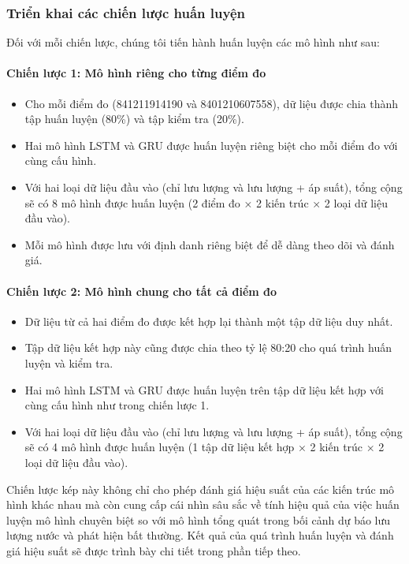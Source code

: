 \subsubsection{Triển khai các chiến lược huấn luyện}

Đối với mỗi chiến lược, chúng tôi tiến hành huấn luyện các mô hình như sau:

\paragraph{Chiến lược 1: Mô hình riêng cho từng điểm đo}
\begin{itemize}
    \item Cho mỗi điểm đo (841211914190 và 8401210607558), dữ liệu được chia thành tập huấn luyện (80\%) và tập kiểm tra (20\%).
    \item Hai mô hình LSTM và GRU được huấn luyện riêng biệt cho mỗi điểm đo với cùng cấu hình.
    \item Với hai loại dữ liệu đầu vào (chỉ lưu lượng và lưu lượng + áp suất), tổng cộng sẽ có 8 mô hình được huấn luyện (2 điểm đo × 2 kiến trúc × 2 loại dữ liệu đầu vào).
    \item Mỗi mô hình được lưu với định danh riêng biệt để dễ dàng theo dõi và đánh giá.
\end{itemize}

\paragraph{Chiến lược 2: Mô hình chung cho tất cả điểm đo}
\begin{itemize}
    \item Dữ liệu từ cả hai điểm đo được kết hợp lại thành một tập dữ liệu duy nhất.
    \item Tập dữ liệu kết hợp này cũng được chia theo tỷ lệ 80:20 cho quá trình huấn luyện và kiểm tra.
    \item Hai mô hình LSTM và GRU được huấn luyện trên tập dữ liệu kết hợp với cùng cấu hình như trong chiến lược 1.
    \item Với hai loại dữ liệu đầu vào (chỉ lưu lượng và lưu lượng + áp suất), tổng cộng sẽ có 4 mô hình được huấn luyện (1 tập dữ liệu kết hợp × 2 kiến trúc × 2 loại dữ liệu đầu vào).
\end{itemize}

Chiến lược kép này không chỉ cho phép đánh giá hiệu suất của các kiến trúc mô hình khác nhau mà còn cung cấp cái nhìn sâu sắc về tính hiệu quả của việc huấn luyện mô hình chuyên biệt so với mô hình tổng quát trong bối cảnh dự báo lưu lượng nước và phát hiện bất thường. Kết quả của quá trình huấn luyện và đánh giá hiệu suất sẽ được trình bày chi tiết trong phần tiếp theo.

